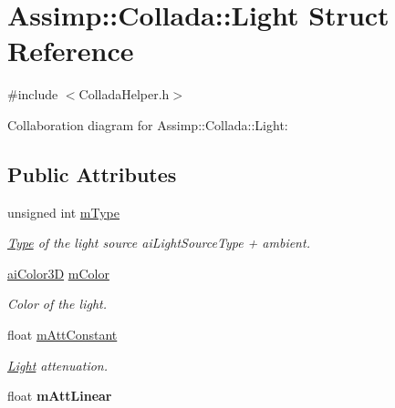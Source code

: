 \hypertarget{struct_assimp_1_1_collada_1_1_light}{\section{Assimp\+:\+:Collada\+:\+:Light Struct Reference}
\label{struct_assimp_1_1_collada_1_1_light}
}


{\ttfamily \#include $<$Collada\+Helper.\+h$>$}



Collaboration diagram for Assimp\+:\+:Collada\+:\+:Light\+:
\subsection*{Public Attributes}
\begin{DoxyCompactItemize}
\item 
\hypertarget{struct_assimp_1_1_collada_1_1_light_afd0ddb16a5b5a5a8d510b1034cb942c8}{unsigned int \hyperlink{struct_assimp_1_1_collada_1_1_light_afd0ddb16a5b5a5a8d510b1034cb942c8}{m\+Type}}\label{struct_assimp_1_1_collada_1_1_light_afd0ddb16a5b5a5a8d510b1034cb942c8}

\begin{DoxyCompactList}\small\item\em \hyperlink{struct_type}{Type} of the light source ai\+Light\+Source\+Type + ambient. \end{DoxyCompactList}\item 
\hypertarget{struct_assimp_1_1_collada_1_1_light_a7683c7be338282e098684fae23e25aca}{\hyperlink{structai_color3_d}{ai\+Color3\+D} \hyperlink{struct_assimp_1_1_collada_1_1_light_a7683c7be338282e098684fae23e25aca}{m\+Color}}\label{struct_assimp_1_1_collada_1_1_light_a7683c7be338282e098684fae23e25aca}

\begin{DoxyCompactList}\small\item\em Color of the light. \end{DoxyCompactList}\item 
\hypertarget{struct_assimp_1_1_collada_1_1_light_a1c2dbb0f8c333f73d0cdbe25016bf491}{float \hyperlink{struct_assimp_1_1_collada_1_1_light_a1c2dbb0f8c333f73d0cdbe25016bf491}{m\+Att\+Constant}}\label{struct_assimp_1_1_collada_1_1_light_a1c2dbb0f8c333f73d0cdbe25016bf491}

\begin{DoxyCompactList}\small\item\em \hyperlink{struct_assimp_1_1_collada_1_1_light}{Light} attenuation. \end{DoxyCompactList}\item 
\hypertarget{struct_assimp_1_1_collada_1_1_light_a9ddfe356df43fdc8765f49b299a36051}{float {\bfseries m\+Att\+Linear}}\label{struct_assimp_1_1_collada_1_1_light_a9ddfe356df43fdc8765f49b299a36051}


\end{DoxyCompactItemize}
